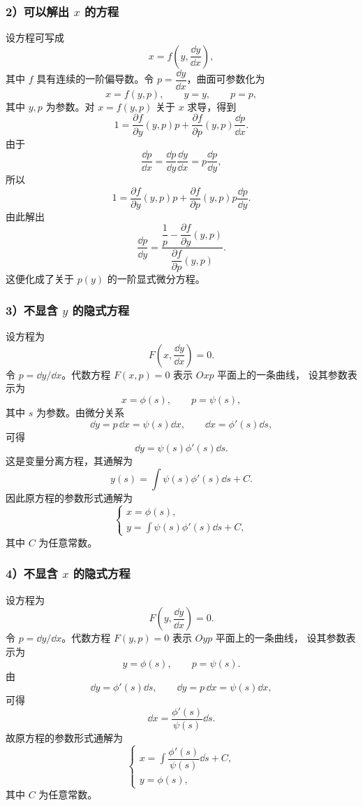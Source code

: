\subsubsection*{2）可以解出 \(x\) 的方程}

设方程可写成
\[
	x=f\left(y,\dfrac{\dd y}{\dd x}\right),
\]
其中 $f$ 具有连续的一阶偏导数。令 $p=\dfrac{\dd y}{\dd x}$，曲面可参数化为
\[
	x=f(y,p),\qquad y=y,\qquad p=p,
\]
其中 $y,p$ 为参数。对 $x=f(y,p)$ 关于 $x$ 求导，得到
\[
	1=\dfrac{\partial f}{\partial y}(y,p)p
	+\dfrac{\partial f}{\partial p}(y,p)\dfrac{\dd p}{\dd x}.
\]
由于
\[
	\dfrac{\dd p}{\dd x}
	=\dfrac{\dd p}{\dd y}\dfrac{\dd y}{\dd x}
	=p\dfrac{\dd p}{\dd y},
\]
所以
\[
	1=\dfrac{\partial f}{\partial y}(y,p)p
	+\dfrac{\partial f}{\partial p}(y,p)p\dfrac{\dd p}{\dd y}.
\]
由此解出
\[
	\dfrac{\dd p}{\dd y}
	=
	\dfrac{\dfrac{1}{p}-\dfrac{\partial f}{\partial y}(y,p)}
	{\dfrac{\partial f}{\partial p}(y,p)}.
\]
这便化成了关于 $p(y)$ 的一阶显式微分方程。

\subsubsection*{3）不显含 \(y\) 的隐式方程}

设方程为
\[
	F\left(x,\dfrac{\dd y}{\dd x}\right)=0.
\]
令 $p=\dd y/\dd x$。代数方程 $F(x,p)=0$ 表示 $Oxp$ 平面上的一条曲线，
设其参数表示为
\[
	x=\phi(s),\qquad p=\psi(s),
\]
其中 $s$ 为参数。由微分关系
\[
	\dd y=p\,\dd x=\psi(s)\dd x,
	\qquad
	\dd x=\phi'(s)\dd s,
\]
可得
\[
	\dd y=\psi(s)\phi'(s)\dd s.
\]
这是变量分离方程，其通解为
\[
	y(s)=\int\psi(s)\phi'(s)\dd s+C.
\]
因此原方程的参数形式通解为
\[
	\begin{cases}
		x=\phi(s),\\
		y=\displaystyle\int\psi(s)\phi'(s)\dd s+C,
	\end{cases}
\]
其中 $C$ 为任意常数。

\subsubsection*{4）不显含 \(x\) 的隐式方程}

设方程为
\[
	F\left(y,\dfrac{\dd y}{\dd x}\right)=0.
\]
令 $p=\dd y/\dd x$。代数方程 $F(y,p)=0$ 表示 $Oyp$ 平面上的一条曲线，
设其参数表示为
\[
	y=\phi(s),\qquad p=\psi(s).
\]
由
\[
	\dd y=\phi'(s)\dd s,
	\qquad
	\dd y=p\,\dd x=\psi(s)\dd x,
\]
可得
\[
	\dd x=\dfrac{\phi'(s)}{\psi(s)}\dd s.
\]
故原方程的参数形式通解为
\[
	\begin{cases}
		x=\displaystyle\int\dfrac{\phi'(s)}{\psi(s)}\dd s+C,\\
		y=\phi(s),
	\end{cases}
\]
其中 $C$ 为任意常数。


